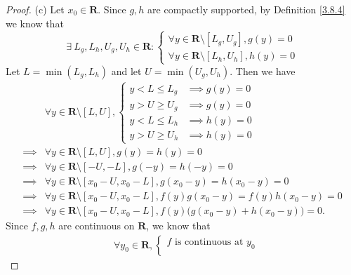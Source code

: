 \begin{proof}{(c)}
    Let \(x_0 \in \mathbf{R}\).
    Since \(g, h\) are compactly supported, by Definition \ref{3.8.4} we know that
    \[
        \exists\ L_g, L_h, U_g, U_h \in \mathbf{R} : \begin{cases}
            \forall y \in \mathbf{R} \setminus [L_g, U_g], g(y) = 0 \\
            \forall y \in \mathbf{R} \setminus [L_h, U_h], h(y) = 0
        \end{cases}
    \]
    Let \(L = \min(L_g, L_h)\) and let \(U = \min(U_g, U_h)\).
    Then we have
    \begin{align*}
                 & \forall y \in \mathbf{R} \setminus [L, U], \begin{cases}
                                                                  y < L \leq L_g & \implies g(y) = 0 \\
                                                                  y > U \geq U_g & \implies g(y) = 0 \\
                                                                  y < L \leq L_h & \implies h(y) = 0 \\
                                                                  y > U \geq U_h & \implies h(y) = 0
                                                              \end{cases}                      \\
        \implies & \forall y \in \mathbf{R} \setminus [L, U], g(y) = h(y) = 0                                         \\
        \implies & \forall y \in \mathbf{R} \setminus [-U, -L], g(-y) = h(-y) = 0                                     \\
        \implies & \forall y \in \mathbf{R} \setminus [x_0 - U, x_0 - L], g(x_0 - y) = h(x_0 - y) = 0                 \\
        \implies & \forall y \in \mathbf{R} \setminus [x_0 - U, x_0 - L], f(y) g(x_0 - y) = f(y) h(x_0 - y) = 0       \\
        \implies & \forall y \in \mathbf{R} \setminus [x_0 - U, x_0 - L], f(y) \big(g(x_0 - y) + h(x_0 - y)\big) = 0.
    \end{align*}
    Since \(f, g, h\) are continuous on \(\mathbf{R}\), we know that
    \begin{align*}
                 & \forall y_0 \in \mathbf{R}, \begin{cases}
                                                   f \text{ is continuous at } y_0 \\

\end{cases}
\end{align*}
\end{proof}
